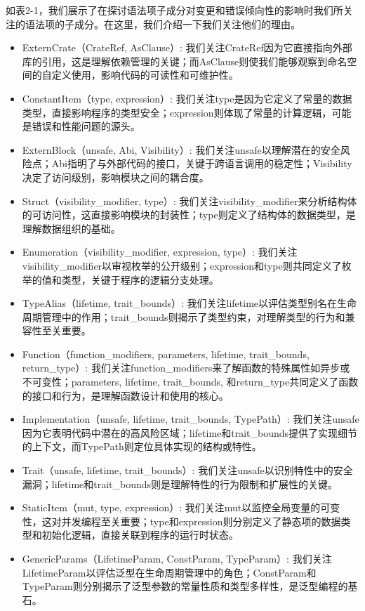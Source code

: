 如表2-1，我们展示了在探讨语法项子成分对变更和错误倾向性的影响时我们所关注的语法项的子成分。在这里，我们介绍一下我们关注他们的理由。
\begin{itemize}
    \item ExternCrate（CrateRef, AsClause）: 我们关注CrateRef因为它直接指向外部库的引用，这是理解依赖管理的关键；而AsClause则使我们能够观察到命名空间的自定义使用，影响代码的可读性和可维护性。
    \item ConstantItem（type, expression）: 我们关注type是因为它定义了常量的数据类型，直接影响程序的类型安全；expression则体现了常量的计算逻辑，可能是错误和性能问题的源头。
    \item ExternBlock（unsafe, Abi, Visibility）: 我们关注unsafe以理解潜在的安全风险点；Abi指明了与外部代码的接口，关键于跨语言调用的稳定性；Visibility决定了访问级别，影响模块之间的耦合度。
    \item Struct（visibility\_modifier, type）: 我们关注visibility\_modifier来分析结构体的可访问性，这直接影响模块的封装性；type则定义了结构体的数据类型，是理解数据组织的基础。
    \item Enumeration（visibility\_modifier, expression, type）: 我们关注visibility\_modifier以审视枚举的公开级别；expression和type则共同定义了枚举的值和类型，关键于程序的逻辑分支处理。
    \item TypeAlias（lifetime, trait\_bounds）: 我们关注lifetime以评估类型别名在生命周期管理中的作用；trait\_bounds则揭示了类型约束，对理解类型的行为和兼容性至关重要。
    \item Function（function\_modifiers, parameters, lifetime, trait\_bounds, return\_type）: 我们关注function\_modifiers来了解函数的特殊属性如异步或不可变性；parameters, lifetime, trait\_bounds, 和return\_type共同定义了函数的接口和行为，是理解函数设计和使用的核心。
    \item Implementation（unsafe, lifetime, trait\_bounds, TypePath）: 我们关注unsafe因为它表明代码中潜在的高风险区域；lifetime和trait\_bounds提供了实现细节的上下文，而TypePath则定位具体实现的结构或特性。
    \item Trait（unsafe, lifetime, trait\_bounds）: 我们关注unsafe以识别特性中的安全漏洞；lifetime和trait\_bounds则是理解特性的行为限制和扩展性的关键。
    \item StaticItem（mut, type, expression）: 我们关注mut以监控全局变量的可变性，这对并发编程至关重要；type和expression则分别定义了静态项的数据类型和初始化逻辑，直接关联到程序的运行时状态。
    \item GenericParams（LifetimeParam, ConstParam, TypeParam）: 我们关注LifetimeParam以评估泛型在生命周期管理中的角色；ConstParam和TypeParam则分别揭示了泛型参数的常量性质和类型多样性，是泛型编程的基石。
\end{itemize}

